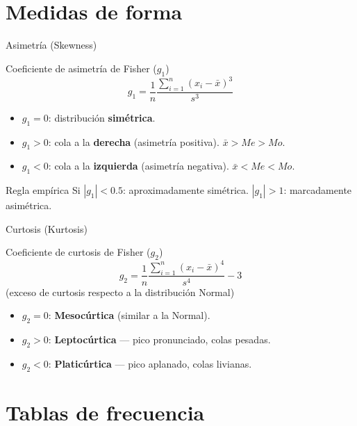 \documentclass[aspectratio=169]{beamer}
\begin{document}
\section{Medidas de forma}

\begin{frame}{Asimetría (Skewness)}
  \begin{block}{Coeficiente de asimetría de Fisher ($g_1$)}
    \[
      g_1 = \frac{1}{n}\frac{\sum_{i=1}^n (x_i - \bar{x})^3}{s^3}
    \]
  \end{block}
  \begin{itemize}
    \item $g_1 = 0$: distribución \textbf{simétrica}.
    \item $g_1 > 0$: cola a la \textbf{derecha} (asimetría positiva). $\bar{x} > Me > Mo$.
    \item $g_1 < 0$: cola a la \textbf{izquierda} (asimetría negativa). $\bar{x} < Me < Mo$.
  \end{itemize}
  \bigskip
  \begin{exampleblock}{Regla empírica}
    Si $|g_1| < 0.5$: aproximadamente simétrica. \quad $|g_1| > 1$: marcadamente asimétrica.
  \end{exampleblock}
\end{frame}

\begin{frame}{Curtosis (Kurtosis)}
  \begin{block}{Coeficiente de curtosis de Fisher ($g_2$)}
    \[
      g_2 = \frac{1}{n}\frac{\sum_{i=1}^n (x_i - \bar{x})^4}{s^4} - 3
    \]
    (exceso de curtosis respecto a la distribución Normal)
  \end{block}
  \begin{itemize}
    \item $g_2 = 0$: \textbf{Mesocúrtica} (similar a la Normal).
    \item $g_2 > 0$: \textbf{Leptocúrtica} — pico pronunciado, colas pesadas.
    \item $g_2 < 0$: \textbf{Platicúrtica} — pico aplanado, colas livianas.
  \end{itemize}
\end{frame}

\section{Tablas de frecuencia}
\end{document}

